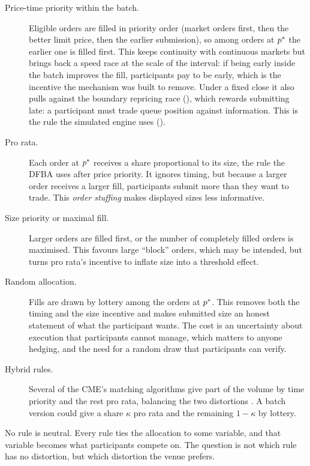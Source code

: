 \begin{description}
  \item[Price-time priority within the batch.] Eligible orders are filled in
  priority order (market orders first, then the better limit price, then
  the earlier submission), so among orders at $p^{\ast}$ the earlier one is
  filled first. This keeps continuity with continuous markets but brings back a
  speed race at the scale of the interval: if being early inside the batch
  improves the fill, participants pay to be early, which is the incentive
  the mechanism was built to remove. Under a fixed close it also pulls
  against the boundary repricing race (), which
  rewards submitting late: a participant must trade queue position against
  information. This is the rule the simulated engine uses
  ().
  \item[Pro rata.] Each order at $p^{\ast}$ receives a share proportional to its
  size, the rule the DFBA uses after price priority. It ignores timing, but
  because a larger order receives a larger fill, participants submit more than they
  want to trade. This \emph{order stuffing} makes displayed sizes less
  informative.
  \item[Size priority or maximal fill.] Larger orders are filled first, or the
  number of completely filled orders is maximised. This favours large
  ``block'' orders, which may be intended, but turns pro rata's incentive to
  inflate size into a threshold effect.
  \item[Random allocation.] Fills are drawn by lottery among the orders at
  $p^{\ast}$. This removes both the timing and the size incentive and makes
  submitted size an honest statement of what the participant wants. The cost is
  an uncertainty about execution that participants cannot manage, which
  matters to anyone hedging, and the need for a random draw that participants
  can verify.
  \item[Hybrid rules.] Several of the CME's matching algorithms give part of
  the volume by time priority and the rest pro rata, balancing the two
  distortions \citep{haynes2020precedence}. A
  batch version could give a share $\kappa$ pro rata and the remaining
  $1 - \kappa$ by lottery.
\end{description}

No rule is neutral. Every rule ties the allocation to some variable, and that
variable becomes what participants compete on. The question is not which
rule has no distortion, but which distortion the venue prefers.

